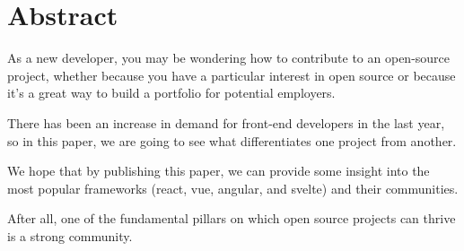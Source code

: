 \section{Abstract}
As a new developer, you may be wondering how to contribute to an open-source project, whether because you have a particular interest in open source or because it's a great way to build a portfolio for potential employers.

There has been an increase in demand for front-end developers in the last year, so in this paper, we are going to see what differentiates one project from another.

We hope that by publishing this paper, we can provide some insight into the most popular frameworks (react, vue, angular, and svelte) and their communities. 

After all, one of the fundamental pillars on which open source projects can thrive is a strong community.